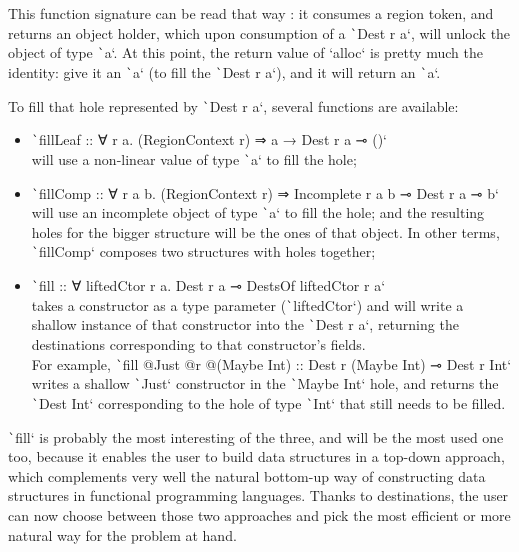 \documentclass[english]{jflart}
\begin{document}
This function signature can be read that way : it consumes a region token, and returns an object holder, which upon consumption of a \texttt`Dest r a`, will unlock the object of type \texttt`a`. At this point, the return value of `alloc` is pretty much the identity: give it an \texttt`a` (to fill the \texttt`Dest r a`), and it will return an \texttt`a`.

To fill that hole represented by \texttt`Dest r a`, several functions are available:

\begin{itemize}
  \item \texttt`fillLeaf :: ∀ r a. (RegionContext r) ⇒ a → Dest r a ⊸ ()` \\will use a non-linear value of type \texttt`a` to fill the hole;
  \item \texttt`fillComp :: ∀ r a b. (RegionContext r) ⇒ Incomplete r a b ⊸ Dest r a ⊸ b` \\will use an incomplete object of type \texttt`a` to fill the hole; and the resulting holes for the bigger structure will be the ones of that object. In other terms, \texttt`fillComp` composes two structures with holes together;
  \item \texttt`fill :: ∀ liftedCtor r a. Dest r a ⊸ DestsOf liftedCtor r a` \\takes a constructor as a type parameter (\texttt`liftedCtor`) and will write a shallow instance of that constructor into the \texttt`Dest r a`, returning the destinations corresponding to that constructor's fields.\\ For example, \texttt`fill @Just @r @(Maybe Int) :: Dest r (Maybe Int) ⊸ Dest r Int` writes a shallow \texttt`Just` constructor in the \texttt`Maybe Int` hole, and returns the \texttt`Dest Int` corresponding to the hole of type \texttt`Int` that still needs to be filled.
\end{itemize}

\texttt`fill` is probably the most interesting of the three, and will be the most used one too, because it enables the user to build data structures in a top-down approach, which complements very well the natural bottom-up way of constructing data structures in functional programming languages. Thanks to destinations, the user can now choose between those two approaches and pick the most efficient or more natural way for the problem at hand.
\end{document}
